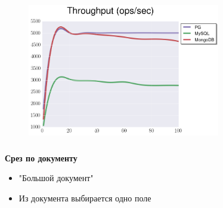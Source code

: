 \documentclass[usenames,dvipsnames, 18pt, compress, aspectratio=169]{beamer}
\begin{document}
\begin{frame}
    \frametitle{}
    \begin{center}
    \begin{figure}
        \includegraphics[width=0.75\textwidth,center]{benchmarks/select_complex_btree_throughput.png}
    \end{figure}
    \end{center}
\end{frame}


\begin{frame}
    \frametitle{}
    \begin{center}
        \textbf{Срез по документу}
        \begin{itemize}[label={}]
            \item "Большой документ"
            \item Из документа выбирается одно поле
        \end{itemize}
    \end{center}
\end{frame}
\end{document}
